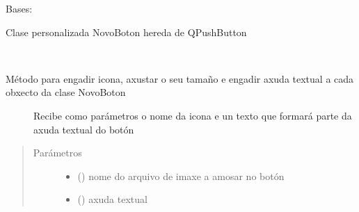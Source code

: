 \documentclass[letterpaper,10pt,spanish]{sphinxmanual}
\begin{document}
\begin{fulllineitems}
\label{\detokenize{api/modulos:modulos.novo_boton.NovoBoton}}
\sphinxAtStartPar
Bases: 

\sphinxAtStartPar
Clase personalizada NovoBoton hereda de QPushButton

\begin{fulllineitems}
\label{\detokenize{api/modulos:modulos.novo_boton.NovoBoton.engade_icona_info_txt}}~\begin{description}
\item[{Método para engadir icona, axustar o seu tamaño e engadir axuda textual a cada obxecto da clase NovoBoton}] \leavevmode
\sphinxAtStartPar
Recibe como parámetros o nome da icona e un texto que formará parte da axuda textual do botón

\end{description}
\begin{quote}\begin{description}
\item[{Parámetros}] \leavevmode\begin{itemize}
\item {} 
\sphinxAtStartPar
{} () \textendash{} nome do arquivo de imaxe a amosar no botón

\item {} 
\sphinxAtStartPar
{} () \textendash{} axuda textual

\end{itemize}

\end{description}\end{quote}

\end{fulllineitems}


\begin{fulllineitems}
\label{\detokenize{api/modulos:modulos.novo_boton.NovoBoton.staticMetaObject}}
\end{fulllineitems}


\end{fulllineitems}
\end{document}
